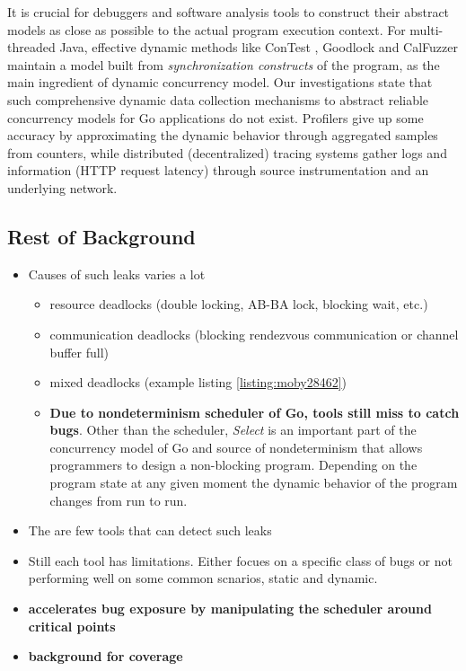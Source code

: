 It is crucial for debuggers and software analysis tools to construct their abstract models as close as possible to the actual program execution context.
%
For multi-threaded Java, effective dynamic methods like ConTest \cite{contest-jgi01}, Goodlock \cite{havelund-goodlock-spin00} and CalFuzzer \cite{joshi-calfuzzer} maintain a model built from \textit{synchronization constructs} of the program, as the main ingredient of dynamic concurrency model.
%
Our investigations state that such comprehensive dynamic data collection mechanisms to abstract reliable concurrency models for Go applications do not exist.
%
Profilers \cite{go-profile-blog} give up some accuracy by approximating the dynamic behavior through aggregated samples from counters,
%
while distributed (decentralized) tracing systems \cite{dapper} gather logs and information (\eg HTTP request latency) through source instrumentation and an underlying network.
%

%





\subsection{Rest of Background}
\begin{itemize}
  \item Causes of such leaks varies a lot
  \begin{itemize}
    \item resource deadlocks (double locking, AB-BA lock, blocking wait, etc.)
    \item communication deadlocks (blocking rendezvous communication or channel buffer full)
    \item mixed deadlocks (example listing \ref{listing:moby28462})
    \item \textbf{Due to nondeterminism scheduler of Go, tools still miss to catch bugs}. Other than the scheduler, \textit{Select} is an important part of the concurrency model of Go and source of nondeterminism that allows programmers to design a non-blocking program. Depending on the program state at any given moment the dynamic behavior of the program changes from run to run.
  \end{itemize}
  \item The are few tools that can detect such leaks
  \item Still each tool has limitations. Either focues on a specific class of bugs or not performing well on some common scnarios, static and dynamic.
  \item \textbf{\goat accelerates bug exposure by manipulating the scheduler around critical points}
  \item \textbf{background for coverage}
\end{itemize}
